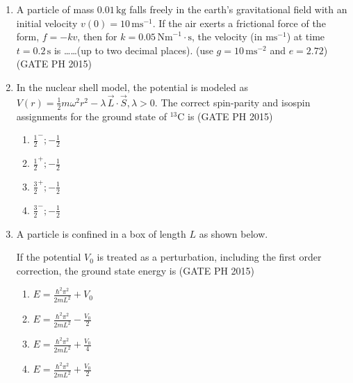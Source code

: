 \documentclass[journal]{IEEEtran}
\begin{document}
\begin{enumerate}

\item
A particle of mass \(0.01 \, \text{kg}\) falls freely in the earth's gravitational field with an initial velocity \( v(0) = 10 \, \text{ms}^{-1} \). If the air exerts a frictional force of the form, \( f = -kv \), then for \( k = 0.05 \, \text{Nm}^{-1} \cdot \text{s} \), the velocity (in \(\text{ms}^{-1}\)) at time \( t = 0.2 \, \text{s} \) is \ldots\ldots (up to two decimal places). (use \( g = 10 \, \text{ms}^{-2} \) and \( e = 2.72 \)) \hfill (GATE PH 2015)

\item
In the nuclear shell model, the potential is modeled as
\(
V(r) = \frac{1}{2} m \omega^2 r^2 - \lambda \, \vec{L} \cdot \vec{S}, \lambda > 0.
\)
The correct spin-parity and isospin assignments for the ground state of \( ^{13}\text{C} \) is \hfill (GATE PH 2015)

\begin{multicols}{4}
    \begin{enumerate}
        \item \( \frac{1}{2}^- ; -\frac{1}{2} \)
        \item \( \frac{1}{2}^+ ; -\frac{1}{2} \)
        \item \( \frac{3}{2}^+ ; -\frac{1}{2} \)
        \item \( \frac{3}{2}^- ; -\frac{1}{2} \)
    \end{enumerate}
\end{multicols}

\item
A particle is confined in a box of length \( L \) as shown below.

\begin{center}
\end{center}

If the potential \( V_0 \) is treated as a perturbation, including the first order correction, the ground state energy is \hfill (GATE PH 2015)

\begin{multicols}{4}
    \begin{enumerate}
        \item \( E = \frac{\hbar^2 \pi^2}{2mL^2} + V_0 \)
        \item \( E = \frac{\hbar^2 \pi^2}{2mL^2} - \frac{V_0}{2} \)
        \item \( E = \frac{\hbar^2 \pi^2}{2mL^2} + \frac{V_0}{4} \)
        \item \( E = \frac{\hbar^2 \pi^2}{2mL^2} + \frac{V_0}{2} \)
    \end{enumerate}
\end{multicols}


\end{enumerate}
\end{document}
